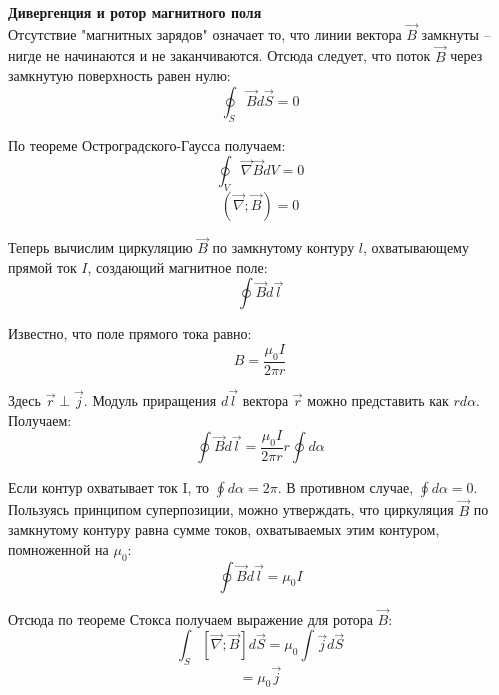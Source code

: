 \documentclass{article}
\begin{document}
	
	\textbf{Дивергенция и ротор магнитного поля}\\

	Отсутствие "магнитных зарядов" означает то, что линии вектора $\vec B$ замкнуты -- нигде не начинаются и не заканчиваются. Отсюда следует, что поток $\vec B$ через замкнутую поверхность равен нулю:
	\begin{equation}
		\oint_S \vec B d\vec S = 0
	\end{equation}

	По теореме Остроградского-Гаусса получаем:
	\begin{equation}
		\oint_V \vec\nabla\vec B dV = 0
	\end{equation}
	\begin{equation}
		(\vec\nabla;\vec B) = 0
	\end{equation}

	Теперь вычислим циркуляцию $\vec B$ по замкнутому контуру $l$, охватывающему прямой ток $I$, создающий магнитное поле:
	\begin{equation}
		\oint \vec B d\vec l
	\end{equation}

	Известно, что поле прямого тока равно:
	\begin{equation}
		B = \frac{\mu_0 I}{2\pi r}
	\end{equation}

	Здесь $\vec r \perp \vec j$. Модуль приращения $d\vec l$ вектора $\vec r$ можно представить как $rd\alpha$. Получаем:
	\begin{equation}
		\oint \vec Bd\vec l = \frac{\mu_0 I}{2\pi r}r\oint d\alpha
	\end{equation} 

	Если контур охватывает ток I, то $\oint d\alpha = 2\pi$. В противном случае, $\oint d\alpha = 0$.\\

	Пользуясь принципом суперпозиции, можно утверждать, что циркуляция $\vec B$ по замкнутому контуру равна сумме токов, охватываемых этим контуром, помноженной на $\mu_0$:
	\begin{equation}
		\oint \vec B d\vec l = \mu_0 I
	\end{equation}

	Отсюда по теореме Стокса получаем выражение для ротора $\vec B$:
	\begin{equation}
		\int_S [\vec\nabla;\vec B] d\vec S = \mu_0 \int \vec j d\vec S
	\end{equation}
	\begin{equation}
		[\vec\nabla;\vec B] = \mu_0 \vec j
	\end{equation}
\end{document}
